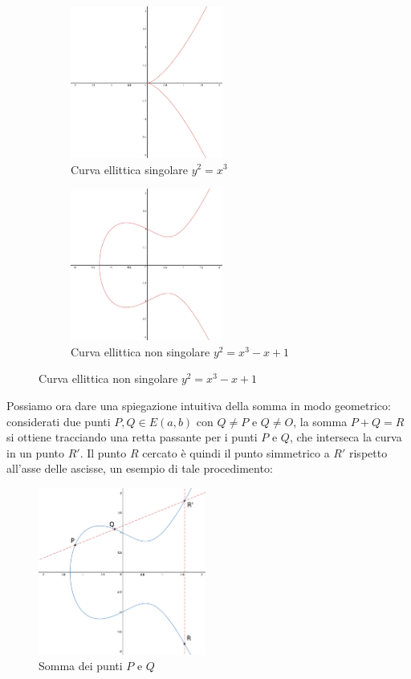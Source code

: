 \documentclass{article}
\begin{document}
	\begin{figure}[H]
		\centering
		\begin{subfigure}{.5\textwidth}
			\centering
			
			\includegraphics[width=5cm, height=5cm]{img/img1}
			
			
			\caption{Curva ellittica singolare $y^{2} = x^{3}$}
			\label{fig:fig1}
		\end{subfigure}%
		\begin{subfigure}{.5\textwidth}
			\centering
			
			\includegraphics[width=5cm, height=5cm]{img/img2}
			
			\caption{Curva ellittica non singolare $y^{2} = x^{3} - x + 1$}
			\label{fig:fig2}
		\end{subfigure}
		
		
	\end{figure}
	
	Possiamo ora dare una spiegazione intuitiva della somma in modo geometrico: considerati due punti $P, Q \in E(a,b)$ con $Q \neq P$ e $Q \neq O$, la somma $P + Q = R$ si ottiene tracciando una retta passante per i punti $P$ e $Q$, che interseca la curva in un punto $R'$. Il punto $R$ cercato è quindi il punto simmetrico a $R'$ rispetto all'asse delle ascisse, un esempio di tale procedimento:
	
	\begin{figure}[H]
		\centering
		
		\includegraphics[width=5.5cm, height=5.5cm]{img/img3}
		
		\caption{Somma dei punti $P$ e $Q$}
		\label{fig:fig3}
	\end{figure}%
	
\end{document}
